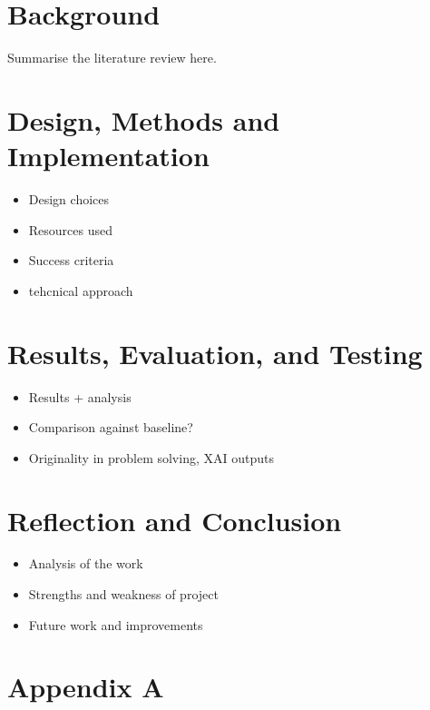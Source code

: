 \documentclass[11pt,a4paper]{article}
\begin{document}
\newpage
\section{Background}
Summarise the literature review here.

\newpage
\section{Design, Methods and Implementation}
\begin{itemize}
    \item Design choices
    \item Resources used
    \item Success criteria
    \item tehcnical approach
\end{itemize}

\newpage
\section{Results, Evaluation, and Testing}
\begin{itemize}
    \item Results + analysis
    \item Comparison against baseline?
    \item Originality in problem solving, XAI outputs
\end{itemize}

\newpage
\section{Reflection and Conclusion}
\begin{itemize}
    \item Analysis of the work
    \item Strengths and weakness of project
    \item Future work and improvements
\end{itemize}


\newpage
{} %

\newpage



\newpage
%
%
\appendix
\section*{Appendix A}
\end{document}
